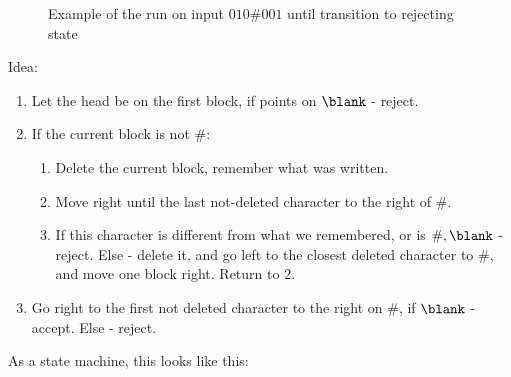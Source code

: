 \begin{example}
\begin{figure}[H]
		\caption{Example of the run on input $010\#001$ until transition to rejecting state}
	\end{figure}
	
	Idea:
	\begin{enumerate}
		\item Let the head be on the first block, if points on $\blank$ - reject.
		\item If the current block is not $\#$:
		\begin{enumerate}[2.1]
			\item Delete the current block, remember what was written.
			\item Move right until the last not-deleted character to the right of $\#$.
			\item If this character is different from what we remembered, or is $\#,\blank$ - reject. Else - delete it, and go left to the closest deleted character to $\#$, and move one block right. Return to $2$.
		\end{enumerate}
		\item Go right to the first not deleted character to the right on $\#$, if $\blank$ - accept. Else - reject.
	\end{enumerate}
	As a state machine, this looks like this:
	

\end{example}
